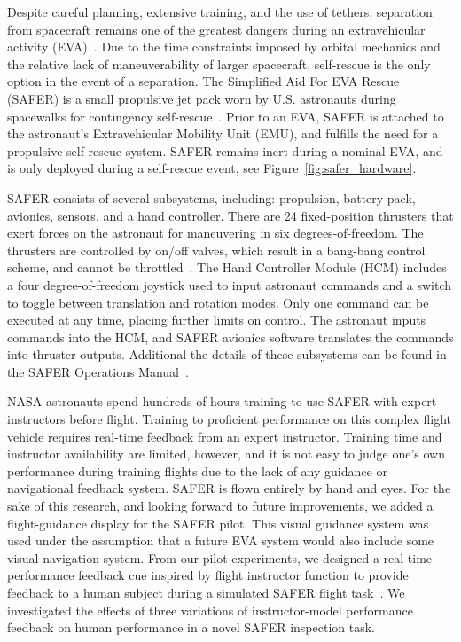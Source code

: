 \documentclass[]{aiaa-tc}%
\begin{document}
Despite careful planning, extensive training, and the use of tethers, separation from spacecraft remains one of the greatest dangers during an extravehicular activity (EVA)~\cite{handley2014pilot}. Due to the time constraints imposed by orbital mechanics and the relative lack of maneuverability of larger spacecraft, self-rescue is the only option in the event of a separation. The Simplified Aid For EVA Rescue (SAFER) is a small propulsive jet pack worn by U.S. astronauts during spacewalks for contingency self-rescue~\cite{safer}. Prior to an EVA, SAFER is attached to the astronaut's Extravehicular Mobility Unit (EMU), and fulfills the need for a propulsive self-rescue system. SAFER remains inert during a nominal EVA, and is only deployed during a self-rescue event, see Figure~\ref{fig:safer_hardware}.

SAFER consists of several subsystems, including: propulsion, battery pack, avionics, sensors, and a hand controller. There are 24 fixed-position thrusters that exert forces on the astronaut for maneuvering in six degrees-of-freedom. The thrusters are controlled by on/off valves, which result in a bang-bang control scheme, and cannot be throttled~\cite{handley2014pilot}. The Hand Controller Module (HCM) includes a four degree-of-freedom joystick used to input astronaut commands and a switch to toggle between translation and rotation modes. Only one command can be executed at any time, placing further limits on control. The astronaut inputs commands into the HCM, and SAFER avionics software translates the commands into thruster outputs. Additional the details of these subsystems can be found in the SAFER Operations Manual~\cite{safer}.

NASA astronauts spend hundreds of hours training to use SAFER with expert instructors before flight. Training to proficient performance on this complex flight vehicle requires real-time feedback from an expert instructor. Training time and instructor availability are limited, however, and it is not easy to judge one's own performance during training flights due to the lack of any guidance or navigational feedback system. SAFER is flown entirely by hand and eyes. For the sake of this research, and looking forward to future improvements, we added a flight-guidance display for the SAFER pilot. This visual guidance system was used under the assumption that a future EVA system would also include some visual navigation system. From our pilot experiments, we designed a real-time performance feedback cue inspired by flight instructor function to provide feedback to a human subject during a simulated SAFER flight task~\cite{karasinski2016development}. We investigated the effects of three variations of instructor-model performance feedback on human performance in a novel SAFER inspection task.
\end{document}
